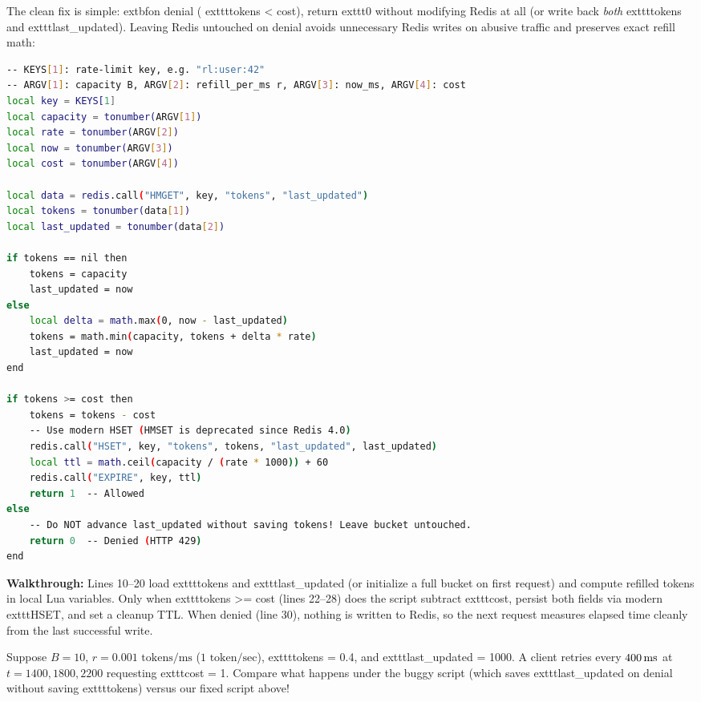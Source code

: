 The clean fix is simple: 	extbf{on denial (	exttt{tokens < cost}), return 	exttt{0} without modifying Redis at all} (or write back \emph{both} 	exttt{tokens} and 	exttt{last\_updated}). Leaving Redis untouched on denial avoids unnecessary Redis writes on abusive traffic and preserves exact refill math:

\begin{lstlisting}[language=sh,caption={Starvation-Free Atomic Token Bucket in Redis Lua (Using 	exttt{HSET})}]
-- KEYS[1]: rate-limit key, e.g. "rl:user:42"
-- ARGV[1]: capacity B, ARGV[2]: refill_per_ms r, ARGV[3]: now_ms, ARGV[4]: cost
local key = KEYS[1]
local capacity = tonumber(ARGV[1])
local rate = tonumber(ARGV[2])
local now = tonumber(ARGV[3])
local cost = tonumber(ARGV[4])

local data = redis.call("HMGET", key, "tokens", "last_updated")
local tokens = tonumber(data[1])
local last_updated = tonumber(data[2])

if tokens == nil then
    tokens = capacity
    last_updated = now
else
    local delta = math.max(0, now - last_updated)
    tokens = math.min(capacity, tokens + delta * rate)
    last_updated = now
end

if tokens >= cost then
    tokens = tokens - cost
    -- Use modern HSET (HMSET is deprecated since Redis 4.0)
    redis.call("HSET", key, "tokens", tokens, "last_updated", last_updated)
    local ttl = math.ceil(capacity / (rate * 1000)) + 60
    redis.call("EXPIRE", key, ttl)
    return 1  -- Allowed
else
    -- Do NOT advance last_updated without saving tokens! Leave bucket untouched.
    return 0  -- Denied (HTTP 429)
end
\end{lstlisting}

\textbf{Walkthrough:} Lines 10--20 load 	exttt{tokens} and 	exttt{last\_updated} (or initialize a full bucket on first request) and compute refilled tokens in local Lua variables. Only when 	exttt{tokens >= cost} (lines 22--28) does the script subtract 	exttt{cost}, persist both fields via modern 	exttt{HSET}, and set a cleanup TTL. When denied (line 30), nothing is written to Redis, so the next request measures elapsed time cleanly from the last successful write.

\begin{tryityourselfbox}
Suppose $B = 10$, $r = 0.001\text{ tokens/ms}$ ($1\text{ token/sec}$), 	exttt{tokens = 0.4}, and 	exttt{last\_updated = 1000}. A client retries every $400\text{\,ms}$ at $t = 1400, 1800, 2200$ requesting 	exttt{cost = 1}. Compare what happens under the buggy script (which saves 	exttt{last\_updated} on denial without saving 	exttt{tokens}) versus our fixed script above!
\end{tryityourselfbox}

